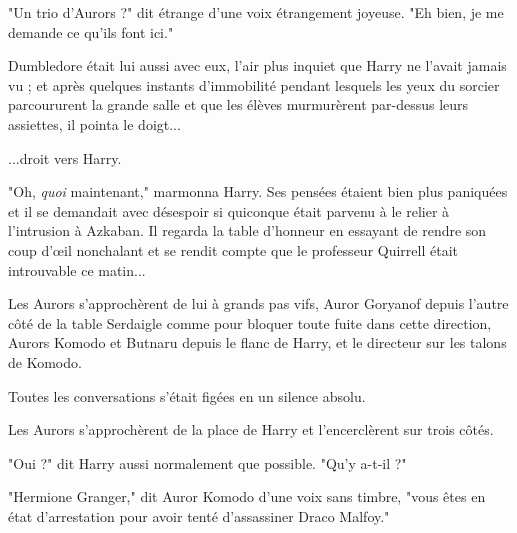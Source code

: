 "Un trio d'Aurors ?" dit étrange d'une voix étrangement joyeuse. "Eh bien, je me demande ce qu'ils font ici."

Dumbledore était lui aussi avec eux, l'air plus inquiet que Harry ne l'avait jamais vu ; et après quelques instants d'immobilité pendant lesquels les yeux du sorcier parcoururent la grande salle et que les élèves murmurèrent par-dessus leurs assiettes, il pointa le doigt...

...droit vers Harry.

"Oh, \emph{quoi}  maintenant," marmonna Harry. Ses pensées étaient bien plus paniquées et il se demandait avec désespoir si quiconque était parvenu à le relier à l'intrusion à Azkaban. Il regarda la table d'honneur en essayant de rendre son coup d'œil nonchalant et se rendit compte que le professeur Quirrell était introuvable ce matin...

Les Aurors s'approchèrent de lui à grands pas vifs, Auror Goryanof depuis l'autre côté de la table Serdaigle comme pour bloquer toute fuite dans cette direction, Aurors Komodo et Butnaru depuis le flanc de Harry, et le directeur sur les talons de Komodo.

Toutes les conversations s'était figées en un silence absolu.

Les Aurors s'approchèrent de la place de Harry et l'encerclèrent sur trois côtés.

"Oui ?" dit Harry aussi normalement que possible. "Qu'y a-t-il ?"

"Hermione Granger," dit Auror Komodo d'une voix sans timbre, "vous êtes en état d'arrestation pour avoir tenté d'assassiner Draco Malfoy."

